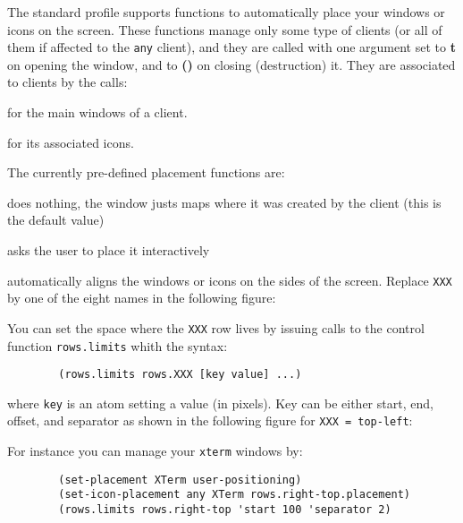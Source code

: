 The standard profile supports functions to automatically place your windows
or icons on the screen. These functions manage only some type of clients (or
all of them if affected to the \verb"any" client), and they are called
with one argument set to {\bf t} on opening the window, and to {\bf ()} on
closing (destruction) it. They are associated to clients by the calls:

\begin{description}

 for the
main windows of a client. 

 for
its associated icons.

\end{description}

The currently pre-defined placement functions are:

\begin{description}

\itemtt{()} does nothing, the window justs maps where it was created
by the client (this is the default value)

 asks the user to place it interactively

 automatically aligns the windows or icons on the
sides of the screen. Replace {\tt XXX} by one of the eight names in the 
following figure:

\centerline{}

You can set the space where the {\tt XXX} row lives by issuing calls to the
control function \verb"rows.limits" whith the syntax:

\begin{verbatim}
        (rows.limits rows.XXX [key value] ...)
\end{verbatim}

where {\tt key} is an atom setting a value (in pixels). Key can be either
start, end, offset, and separator as shown in the following figure for 
{\tt XXX = top-left}:

\centerline{}

\end{description}

For instance you can manage your \verb"xterm" windows by:

{\exemplefont\begin{verbatim}
        (set-placement XTerm user-positioning)
        (set-icon-placement any XTerm rows.right-top.placement)
        (rows.limits rows.right-top 'start 100 'separator 2)
\end{verbatim}}


